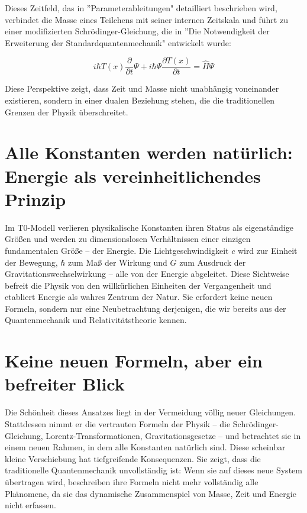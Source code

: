 \documentclass[a4paper,12pt]{article}
\newcommand{\Tfield}{T(x)}
\begin{document}
	Dieses Zeitfeld, das in ''Parameterableitungen" \cite{pascher_params_2025} detailliert beschrieben wird, verbindet die Masse eines Teilchens mit seiner internen Zeitskala und führt zu einer modifizierten Schrödinger-Gleichung, die in ''Die Notwendigkeit der Erweiterung der Standardquantenmechanik" \cite{pascher_erweiterung_2025} entwickelt wurde:
	
	\begin{equation}
		i\hbar \Tfield \frac{\partial}{\partial t} \Psi + i\hbar \Psi \frac{\partial \Tfield}{\partial t} = \hat{H} \Psi
	\end{equation}
	
	Diese Perspektive zeigt, dass Zeit und Masse nicht unabhängig voneinander existieren, sondern in einer dualen Beziehung stehen, die die traditionellen Grenzen der Physik überschreitet.
	
	\section{Alle Konstanten werden natürlich: Energie als vereinheitlichendes Prinzip}
	
	Im T0-Modell verlieren physikalische Konstanten ihren Status als eigenständige Größen und werden zu dimensionslosen Verhältnissen einer einzigen fundamentalen Größe – der Energie. Die Lichtgeschwindigkeit \(c\) wird zur Einheit der Bewegung, \(\hbar\) zum Maß der Wirkung und \(G\) zum Ausdruck der Gravitationswechselwirkung – alle von der Energie abgeleitet. Diese Sichtweise befreit die Physik von den willkürlichen Einheiten der Vergangenheit und etabliert Energie als wahres Zentrum der Natur. Sie erfordert keine neuen Formeln, sondern nur eine Neubetrachtung derjenigen, die wir bereits aus der Quantenmechanik und Relativitätstheorie kennen.
	
	\section{Keine neuen Formeln, aber ein befreiter Blick}
	
	Die Schönheit dieses Ansatzes liegt in der Vermeidung völlig neuer Gleichungen. Stattdessen nimmt er die vertrauten Formeln der Physik – die Schrödinger-Gleichung, Lorentz-Transformationen, Gravitationsgesetze – und betrachtet sie in einem neuen Rahmen, in dem alle Konstanten natürlich sind. Diese scheinbar kleine Verschiebung hat tiefgreifende Konsequenzen. Sie zeigt, dass die traditionelle Quantenmechanik unvollständig ist: Wenn sie auf dieses neue System übertragen wird, beschreiben ihre Formeln nicht mehr vollständig alle Phänomene, da sie das dynamische Zusammenspiel von Masse, Zeit und Energie nicht erfassen.
	
\end{document}
